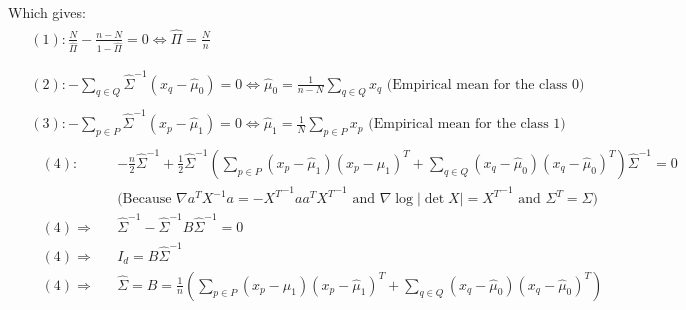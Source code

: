 \documentclass{article}
\begin{document}
Which gives:
\begin{equation*}
    \begin{aligned}
         & \begin{aligned}
            (1): \frac{N}{\widehat\Pi} - \frac{n-N}{1-\widehat\Pi} = 0 \Leftrightarrow \widehat\Pi = \frac{N}{n} \\
        \end{aligned}  \\
         & \begin{aligned}
            (2): - \sum_{q\in Q} \widehat\Sigma^{-1} (x_q - \widehat\mu_0) = 0 \Leftrightarrow \widehat\mu_0 = \frac{1}{n - N} \sum_{q\in Q} x_q \text{ (Empirical mean for the class $0$)}
        \end{aligned}  \\
         & \begin{aligned}
            (3): - \sum_{p\in P} \widehat\Sigma^{-1} (x_p - \widehat\mu_1) = 0 \Leftrightarrow \widehat\mu_1 = \frac{1}{N} \sum_{p\in P} x_p \text{ (Empirical mean for the class $1$)}
        \end{aligned}  \\
         & \begin{aligned}
             & (4):           &  & -\frac{n}{2}\widehat\Sigma^{-1} + \frac{1}{2} \widehat\Sigma^{-1} \left(\sum_{p \in P} (x_p - \widehat\mu_1) (x_p - \widehat\mu_1)^T + \sum_{q \in Q} (x_q - \widehat\mu_0) (x_q - \widehat\mu_0)^T\right)\widehat\Sigma^{-1} = 0 & \\
             &                &  & \text{(Because }\nabla a^TX^{-1}a = -{X^T}^{-1}aa^T{X^T}^{-1} \text{ and } \nabla \log|\det X| = {X^T}^{-1} \text{ and } \Sigma^T = \Sigma)                                                                                       & \\
             & (4)\Rightarrow &  & \widehat\Sigma^{-1} - \widehat\Sigma^{-1} B \widehat\Sigma^{-1} = 0                                                                                                                                                               & \\
             & (4)\Rightarrow &  & I_d = B \widehat\Sigma^{-1}                                                                                                                                                                                                       & \\
             & (4)\Rightarrow &  & \widehat\Sigma = B =  \frac{1}{n}\left(\sum_{p \in P} (x_p - \widehat\mu_1) (x_p - \widehat\mu_1)^T + \sum_{q \in Q} (x_q - \widehat\mu_0) (x_q - \widehat\mu_0)^T\right)                                                           \\
        \end{aligned} \\
    \end{aligned}
\end{equation*}
\end{document}
